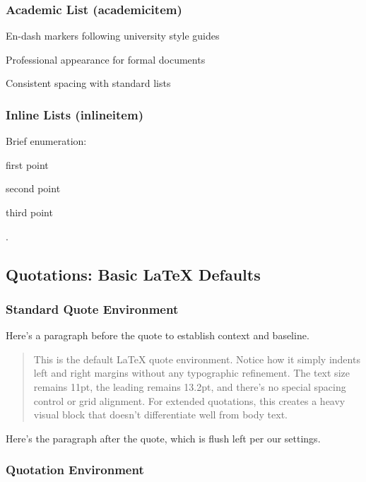 \documentclass[11pt]{article}
\begin{document}
\subsubsection{Academic List (academicitem)}
\begin{academicitem}
\item En-dash markers following university style guides
\item Professional appearance for formal documents
\item Consistent spacing with standard lists
\end{academicitem}

\subsubsection{Inline Lists (inlineitem)}
Brief enumeration: \begin{inlineitem}
\item first point \item second point \item third point
\end{inlineitem}.

\subsection{Quotations: Basic LaTeX Defaults}

\subsubsection{Standard Quote Environment}

Here's a paragraph before the quote to establish context and baseline.

\begin{quote}
This is the default LaTeX quote environment. Notice how it simply indents left and right margins without any typographic refinement. The text size remains 11pt, the leading remains 13.2pt, and there's no special spacing control or grid alignment. For extended quotations, this creates a heavy visual block that doesn't differentiate well from body text.
\end{quote}

Here's the paragraph after the quote, which is flush left per our settings.

\subsubsection{Quotation Environment}
\end{document}

